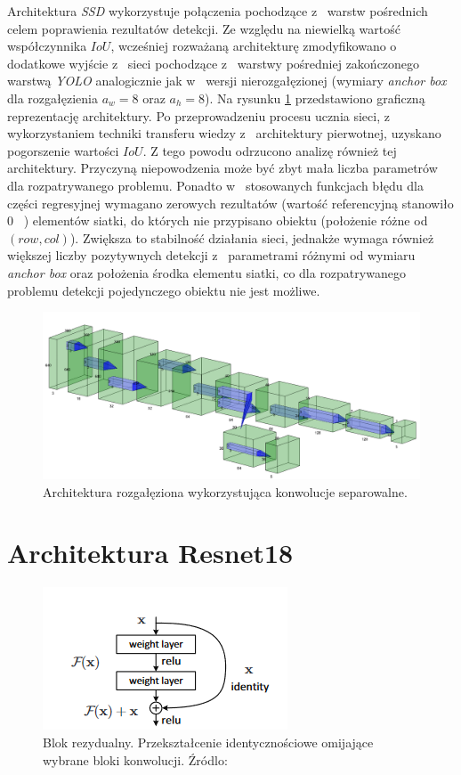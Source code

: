 Architektura \emph{SSD} wykorzystuje połączenia pochodzące z~ warstw pośrednich celem poprawienia rezultatów detekcji.  
Ze względu na niewielką wartość współczynnika $IoU$, wcześniej rozważaną architekturę zmodyfikowano o~  dodatkowe wyjście z~ sieci pochodzące z~ warstwy pośredniej zakończonego warstwą \emph{YOLO} analogicznie jak w~ wersji nierozgałęzionej (wymiary \emph{anchor box} dla rozgałęzienia $a_w = 8$ oraz  $a_h = 8$). 
Na rysunku \ref{fig:arch_v2} przedstawiono graficzną reprezentację architektury. 
Po przeprowadzeniu procesu ucznia sieci, z~ wykorzystaniem techniki transferu wiedzy z~ architektury pierwotnej, uzyskano pogorszenie wartości $IoU$.
Z tego powodu odrzucono analizę również tej architektury.
Przyczyną niepowodzenia może być zbyt mała liczba parametrów dla rozpatrywanego problemu.
Ponadto w~ stosowanych funkcjach błędu dla części regresyjnej wymagano zerowych rezultatów (wartość referencyjną stanowiło 0~ ) elementów siatki, do których nie przypisano obiektu (położenie różne od $(row,col)$).
Zwiększa to stabilność działania sieci, jednakże wymaga również większej liczby pozytywnych detekcji z~ parametrami różnymi od wymiaru \emph{anchor box} oraz położenia środka elementu siatki, co dla rozpatrywanego problemu detekcji pojedynczego obiektu nie jest możliwe. 

\begin{figure}
    \centering
    \includegraphics[width=\linewidth]{images/Architektura_branched.png}
    \caption{Architektura rozgałęziona wykorzystująca konwolucje separowalne.}
    \label{fig:arch_v2}
\end{figure}


\section{Architektura Resnet18}

\begin{figure}
    \centering
    \includegraphics{images/residual.png}
    \caption{Blok rezydualny. Przekształcenie identycznościowe omijające wybrane bloki konwolucji. Źródlo: \cite{resnet18}}
    \label{fig:res_block}
\end{figure}

